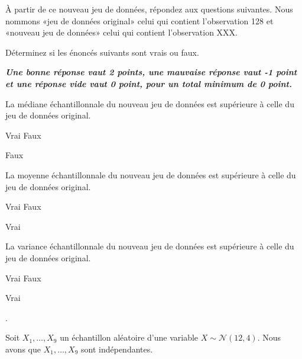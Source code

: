 \begin{questions}
\begin{parts}
À partir de ce nouveau jeu de données, répondez aux questions suivantes. Nous nommons «jeu de données original» celui qui contient l'observation 128 et «nouveau jeu de données» celui qui contient l'observation XXX.

Déterminez si les énoncés suivants sont vrais ou faux. 

\textbf{\textit{Une bonne réponse vaut 2 points, une mauvaise réponse vaut -1 point et une réponse vide vaut 0 point, pour un total minimum de 0 point.}}

\begin{subparts}
\subpart La médiane échantillonnale du nouveau jeu de données est supérieure à celle du jeu de données original.

    \begin{oneparcheckboxes}
        \choice Vrai
        \correctchoice Faux
    \end{oneparcheckboxes}
    
\begin{solution}
    Faux
\end{solution}

\subpart La moyenne échantillonnale du nouveau jeu de données est supérieure à celle du jeu de données original.

    \begin{oneparcheckboxes}
        \correctchoice Vrai
        \choice Faux
    \end{oneparcheckboxes}
    
\begin{solution}
    Vrai
\end{solution}

\subpart La variance échantillonnale du nouveau jeu de données est supérieure à celle du jeu de données original.

    \begin{oneparcheckboxes}
        \correctchoice Vrai
        \choice Faux
    \end{oneparcheckboxes}
    
\begin{solution}
    Vrai
\end{solution}

\end{subparts}
\end{parts}

\newpage . \newpage
\question\label{estimateursPonctuels} 

Soit $X_1, \hdots, X_9$ un échantillon aléatoire d'une variable $X\sim\mathcal{N}(12, 4)$. Nous avons que $X_1, \dots, X_9$ sont indépendantes. 


\end{questions}
